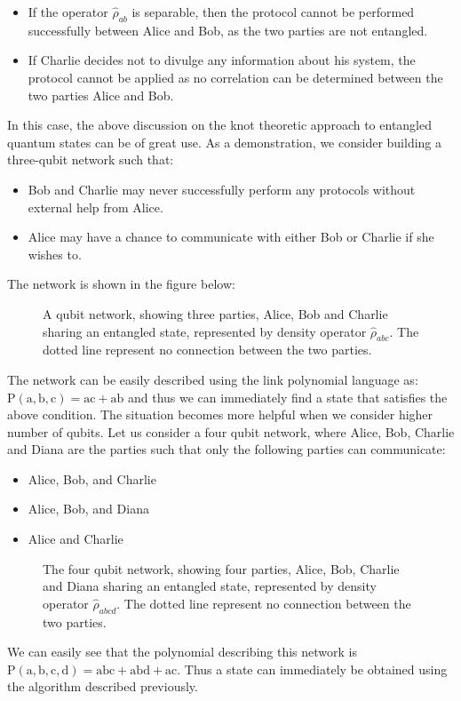 \documentclass{scrartcl}
\begin{document}
\begin{itemize}
    \item If the operator $\hat{\rho}_{ab}$ is separable, then the protocol cannot be performed successfully between Alice and Bob, as the two parties are not entangled. 
    \item If Charlie decides not to divulge any information about his system, the protocol cannot be applied as no correlation can be determined between the two parties Alice and Bob.
\end{itemize}
In this case, the above discussion on the knot theoretic approach to entangled quantum states can be of great use. As a demonstration, we consider building a three-qubit network such that: 
\begin{itemize}
    \item Bob and Charlie may never successfully perform any
    protocols without external help from Alice.
    \item Alice may
    have a chance to communicate with either Bob or Charlie
    if she wishes to.
\end{itemize}
The network is shown in the figure below:
\begin{figure}[H]
    \centering

\caption{A qubit network, showing three parties, Alice, Bob and Charlie sharing an entangled state, represented by density operator $\hat{\rho}_{abc}$. The dotted line represent no connection between the two parties.}
\end{figure}
\noindent
The network can be easily described using the link polynomial language as: $\mathrm{P(a,b,c)= ac+ab}$ and thus we can immediately find a state that satisfies the above condition. The situation becomes more helpful when we consider higher number of qubits. Let us consider a four qubit network, where Alice, Bob, Charlie and Diana are the parties such that only the following parties can communicate:
\begin{itemize}
    \item Alice, Bob, and Charlie
    \item Alice, Bob, and Diana
    \item Alice and Charlie
\end{itemize}
\begin{figure}[H]
    \centering

\caption{The four qubit network, showing four parties, Alice, Bob, Charlie and Diana sharing an entangled state, represented by density operator $\hat{\rho}_{abcd}$. The dotted line represent no connection between the two parties.}
\end{figure}
We can easily see that the polynomial describing this network is $\mathrm{P(a,b,c,d) = abc+abd+ac}$. Thus a state can immediately be obtained using the algorithm described previously.
\end{document}
